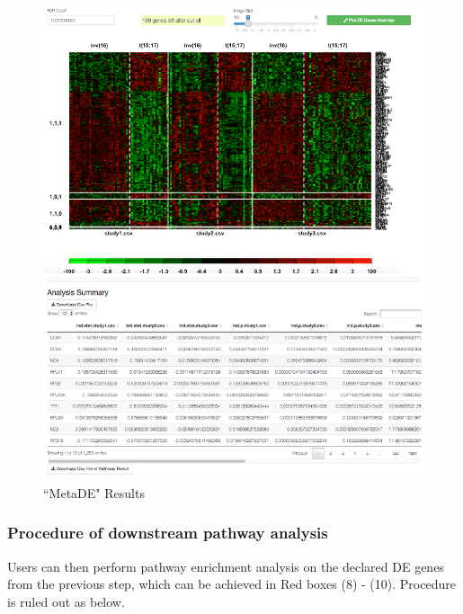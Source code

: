 \begin{figure}[H]
\begin{center}
\includegraphics[scale=0.7]{./figure/metaDE/metaDEresult.pdf}
\caption{``MetaDE" Results}
\label{fig:MetaDEresult1}
\end{center}
\end{figure}

\subsubsection{Procedure of downstream pathway analysis}
Users can then perform pathway enrichment analysis on the declared DE genes from the previous step, 
which can be achieved in {\color{red} Red boxes (8) - (10)}.
Procedure is ruled out as below.

